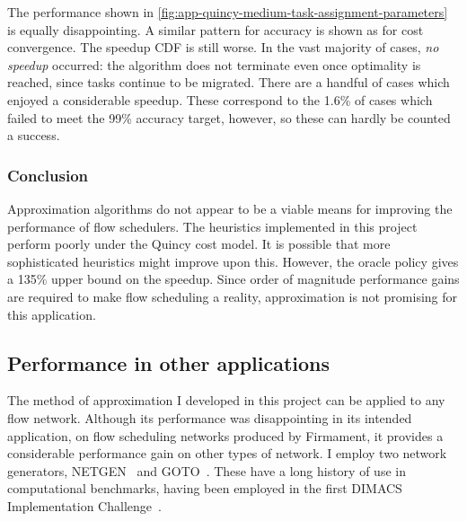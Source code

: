 The performance shown in \cref{fig:app-quincy-medium-task-assignment-parameters} is equally disappointing. A similar pattern for accuracy is shown as for cost convergence. The speedup CDF is still worse. In the vast majority of cases, \emph{no speedup} occurred: the algorithm does not terminate even once optimality is reached, since tasks continue to be migrated. There are a handful of cases which enjoyed a considerable speedup. These correspond to the 1.6\% of cases which failed to meet the 99\% accuracy target, however, so these can hardly be counted a success.

\subsubsection{Conclusion}

Approximation algorithms do not appear to be a viable means for improving the performance of flow schedulers. The heuristics implemented in this project perform poorly under the Quincy cost model. It is possible that more sophisticated heuristics might improve upon this. However, the oracle policy gives a 135\% upper bound on the speedup. Since order of magnitude performance gains are required to make flow scheduling a reality, approximation is not promising for this application.

\subsection{Performance in other applications}

The method of approximation I developed in this project can be applied to any flow network. Although its performance was disappointing in its intended application, on flow scheduling networks produced by Firmament, it provides a considerable performance gain on other types of network. I employ two network generators, NETGEN~\cite{Klingman:1974} and GOTO~\cite{GoldbergDIMACS:1993}. These have a long history of use in computational benchmarks, having been employed in the first DIMACS Implementation Challenge~\cite{DIMACSChallenge:Book}.

